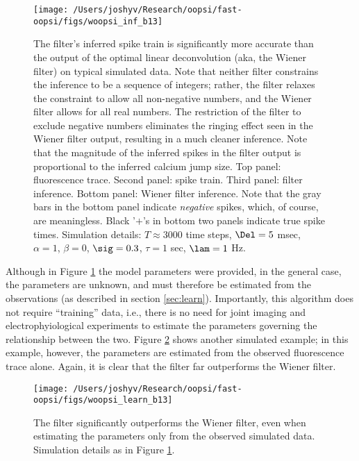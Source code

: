 \begin{figure}[h!]
\centering \texttt{[image: /Users/joshyv/Research/oopsi/fast-oopsi/figs/woopsi\_inf\_b13]}
\caption[\foopsi filter outperforms Wiener filter]{The \foopsi filter's inferred spike train is significantly more accurate than the output of the optimal linear deconvolution (aka, the Wiener filter) on typical simulated data. Note that neither filter constrains the inference to be a sequence of integers; rather, the \foopsi filter relaxes the constraint to allow all non-negative numbers, and the Wiener filter allows for all real numbers.  The restriction of the \foopsi filter to exclude negative numbers eliminates the ringing effect seen in the Wiener filter output, resulting in a much cleaner inference.  Note that the magnitude of the inferred spikes in the \foopsi filter output is proportional to the inferred calcium jump size.  Top panel: fluorescence trace.  Second panel: spike train.  Third panel: \foopsi filter inference.  Bottom panel: Wiener filter inference.  Note that the gray bars in the bottom panel indicate \emph{negative} spikes, which, of course, are meaningless. Black '$+$'s in bottom two panels indicate true spike times.  Simulation details: $T\approx 3000$ time steps, $\Del=5$ msec, $\alpha=1$, $\beta=0$, $\sig=0.3$, $\tau=1$ sec, $\lam=1$ Hz.} \label{fig:woopsi_inf}
\end{figure}


Although in Figure \ref{fig:woopsi_inf} the model parameters were provided, in the general case, the parameters are unknown, and must therefore be estimated from the observations (as described in section \ref{sec:learn}). Importantly, this algorithm does not require ``training'' data, i.e., there is no need for joint imaging and electrophyiological experiments to estimate the parameters governing the relationship between the two.  Figure \ref{fig:woopsi_learn} shows another simulated example; in this example, however, the parameters are estimated from the observed fluorescence trace alone.  Again, it is clear that the \foopsi filter far outperforms the Wiener filter.

\begin{figure}[h!]
\centering \texttt{[image: /Users/joshyv/Research/oopsi/fast-oopsi/figs/woopsi\_learn\_b13]}
\caption[parameters may be estimated using the \foopsi filter]{The \foopsi filter significantly outperforms the Wiener filter, even when estimating the parameters only from the observed simulated data.  Simulation details as in Figure \ref{fig:woopsi_inf}.} \label{fig:woopsi_learn}
\end{figure}

